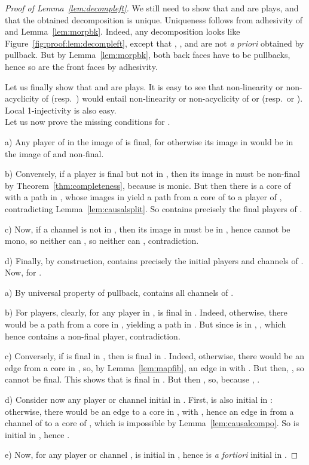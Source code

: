 \documentclass{LMCS}
\theoremstyle{plain}\newtheorem{satz}[thm]{Satz}
\begin{document}
\begin{proof}[Proof of Lemma~\ref{lem:decompleft}]
We still need to show that  and  are
plays, and that the obtained decomposition is unique.  Uniqueness
follows from adhesivity of  and Lemma~\ref{lem:morpbk}. Indeed,
any decomposition looks like Figure~\ref{fig:proof:lem:decompleft},
except that , , and  are not \emph{a priori} obtained by
pullback. But by Lemma~\ref{lem:morpbk}, both back faces have to be
pullbacks, hence so are the front faces by adhesivity.

Let us finally show that  and  are plays. It is easy to see
that non-linearity or non-acyclicity of  (resp.\ )
would entail non-linearity or non-acyclicity of  or  (resp.\
or ). Local 1-injectivity
is also easy. \\

Let us now prove the missing conditions for .

a) Any player  of  in the image of  is final, for
otherwise its image in  would be in the image of  and
non-final. 

b) Conversely, if a player  is final but not in , then
its image in  must be non-final by Theorem~\ref{thm:completeness},
because  is monic. But then there is a core  of 
with a path  in , whose images in  yield a path
from a core of  to a player of , contradicting
Lemma~\ref{lem:causalsplit}. So  contains precisely the final
players of . 

c) Now, if a channel  is not in , then its image in 
must be in , hence  cannot be mono, so neither can , so neither can , contradiction.

d) Finally, by construction,  contains precisely the initial
players
and channels of .\\

Now, for .

a) By universal property of pullback,  contains all channels of
. 

b) For players, clearly, for any player  in ,  is final in
. Indeed, otherwise, there would be a path  from a
core  in , yielding a path  in
. But since  is in , , which hence contains
a non-final player, contradiction.

c) Conversely, if  is final in , then  is final
in . Indeed, otherwise, there would be an edge  from
a core in , so, by Lemma~\ref{lem:mapfib}, an edge  in
 with . But then, , so  cannot be
final. This shows that  is final in . But then ,
so, because , .

d) Consider now any player or channel  initial in . First,  is also
initial in : otherwise, there would be an edge  to a
core in , with , hence an edge  in
 from a channel of  to a core of , which is impossible by
Lemma~\ref{lem:causalcompo}. So  is initial in , hence .

e) Now, for any player or channel ,  is initial in , hence  is
\emph{a fortiori} initial in . 
\end{proof}
\end{document}
